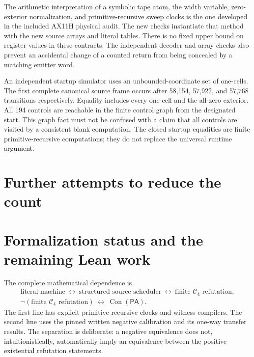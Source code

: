 \documentclass[11pt,letterpaper]{article}
\theoremstyle{definition}
\newcommand{\PA}{\mathsf{PA}}
\newcommand{\Con}{\operatorname{Con}}
\newcommand{\Cfour}{\mathcal C_4}
\begin{document}
The arithmetic interpretation of a symbolic tape atom, the width variable,
zero-exterior normalization, and primitive-recursive sweep clocks is the
one developed in the included AX11H physical audit. The new checks
instantiate that method with the new source arrays and literal tables.
There is no fixed upper bound on register values in these contracts.
The independent decoder and array checks also prevent an accidental
change of a counted return from being concealed by a matching emitter word.



An independent startup simulator uses an unbounded-coordinate set of
one-cells. The first complete canonical source frame occurs after 58,154,
57,922, and 57,768 transitions respectively. Equality includes every one-cell
and the all-zero exterior. All 194 controls are reachable in the finite
control graph from the designated start. This graph fact must not be
confused with a claim that all controls are visited by a consistent blank
computation. The closed startup equalities are finite primitive-recursive
computations; they do not replace the universal runtime argument.

\section{Further attempts to reduce the count}
\label{sec:search}



\section{Formalization status and the remaining Lean work}
\label{sec:formal-status}
The complete mathematical dependence is
\[
\begin{gathered}
 \text{literal machine}\ \longleftrightarrow\
 \text{structured source scheduler}\ \longleftrightarrow\
 \text{finite $\Cfour$ refutation},\\
 \neg(\text{finite $\Cfour$ refutation})\
 \longleftrightarrow\ \Con(\PA).
\end{gathered}
\]
The first line has explicit primitive-recursive clocks and witness
compilers. The second line uses the pinned written negative calibration
and its one-way transfer results. The separation is deliberate: a
negative equivalence does not, intuitionistically, automatically imply
an equivalence between the positive existential refutation statements.
\end{document}
